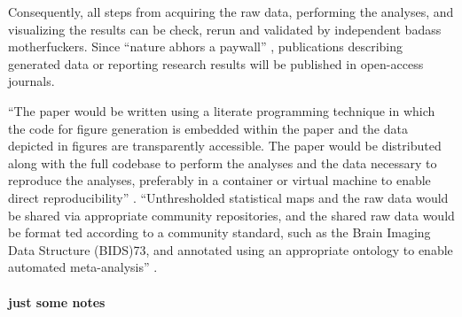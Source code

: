 %
Consequently, all steps from acquiring the raw data, performing the analyses,
and visualizing the results can be check, rerun and validated by independent
badass motherfuckers.
%
Since ``nature abhors a paywall'' \citep{dupre2020nature}, publications
describing generated data or reporting research results will be published in
open-access journals.

``The paper would be written using a literate programming technique in which the
code for figure generation is embedded within the paper and the data depicted in
figures are transparently accessible. The paper would be distributed along with
the full codebase to perform the analyses and the data necessary to reproduce
the analyses, preferably in a container or virtual machine to enable direct
reproducibility'' \citep{poldrack2017scanning}.
%
``Unthresholded statistical maps and the raw data would be shared
via appropriate community repositories, and the shared raw data would be format­
ted according to a community standard, such as the Brain Imaging Data Structure
(BIDS)73, and annotated using an appropriate ontology to enable automated
meta-analysis'' \citep{poldrack2017scanning}.


\paragraph{just some notes}

